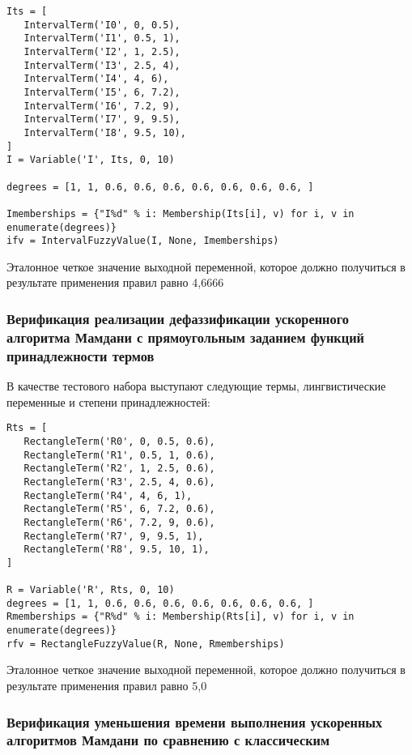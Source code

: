 \begin{lstlisting}[style=pythonstyle,caption={  }, label=lst:func:1]
Its = [
   IntervalTerm('I0', 0, 0.5),
   IntervalTerm('I1', 0.5, 1),
   IntervalTerm('I2', 1, 2.5),
   IntervalTerm('I3', 2.5, 4),
   IntervalTerm('I4', 4, 6),
   IntervalTerm('I5', 6, 7.2),
   IntervalTerm('I6', 7.2, 9),
   IntervalTerm('I7', 9, 9.5),
   IntervalTerm('I8', 9.5, 10),
]
I = Variable('I', Its, 0, 10)

degrees = [1, 1, 0.6, 0.6, 0.6, 0.6, 0.6, 0.6, 0.6, ]

Imemberships = {"I%d" % i: Membership(Its[i], v) for i, v in enumerate(degrees)}
ifv = IntervalFuzzyValue(I, None, Imemberships)
\end{lstlisting}


Эталонное четкое значение выходной переменной, которое должно получиться в результате применения правил равно 4,6666

\subsubsection{Верификация реализации дефаззификации ускоренного алгоритма Мамдани с прямоугольным заданием функций принадлежности термов }

В качестве тестового набора выступают следующие термы, лингвистические переменные и степени принадлежностей:

\begin{lstlisting}[style=pythonstyle,caption={  }, label=lst:func:1]
Rts = [
   RectangleTerm('R0', 0, 0.5, 0.6),
   RectangleTerm('R1', 0.5, 1, 0.6),
   RectangleTerm('R2', 1, 2.5, 0.6),
   RectangleTerm('R3', 2.5, 4, 0.6),
   RectangleTerm('R4', 4, 6, 1),
   RectangleTerm('R5', 6, 7.2, 0.6),
   RectangleTerm('R6', 7.2, 9, 0.6),
   RectangleTerm('R7', 9, 9.5, 1),
   RectangleTerm('R8', 9.5, 10, 1),
]

R = Variable('R', Rts, 0, 10)
degrees = [1, 1, 0.6, 0.6, 0.6, 0.6, 0.6, 0.6, 0.6, ]
Rmemberships = {"R%d" % i: Membership(Rts[i], v) for i, v in enumerate(degrees)}
rfv = RectangleFuzzyValue(R, None, Rmemberships)
\end{lstlisting}

Эталонное четкое значение выходной переменной, которое должно получиться в результате применения правил равно 5,0


\subsubsection{Верификация уменьшения времени выполнения ускоренных алгоритмов Мамдани по сравнению с классическим }

